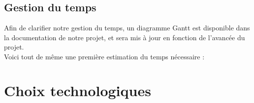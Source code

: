 \documentclass[a4paper]{article}
\newcommand{\alinea}{\hspace*{0.5cm}}
\begin{document}
      \subsection{Gestion du temps}
        \label{GestionTps}
        \alinea Afin de clarifier notre gestion du temps, un diagramme Gantt est disponible dans la documentation de notre projet, et sera mis à jour en fonction de l'avancée du projet.\\
        \alinea Voici tout de même une première estimation du temps nécessaire :
        \begin{center}
        \end{center}

    \section{Choix technologiques}
\end{document}
